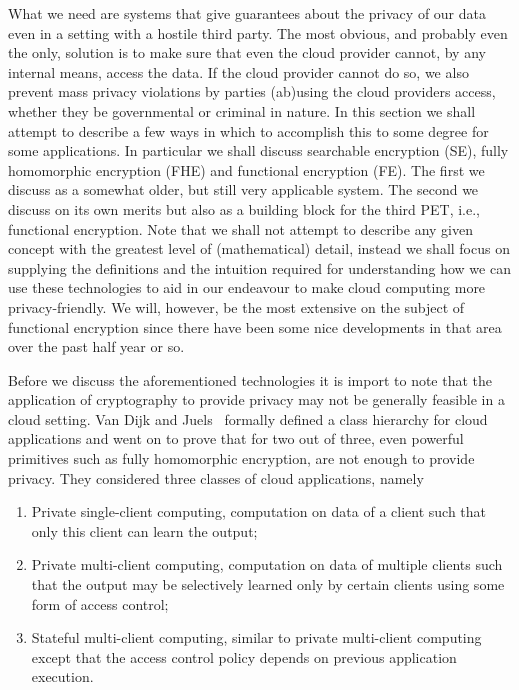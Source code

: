 \documentclass[11pt, a4paper]{article}
\begin{document}
What we need are systems that give guarantees about the privacy of our data even in a setting with a hostile third party.
The most obvious, and probably even the only, solution is to make sure that even the cloud provider cannot, by any internal means, access the data.
If the cloud provider cannot do so, we also prevent mass privacy violations by parties (ab)using the cloud providers access, whether they be governmental or criminal in nature.
In this section we shall attempt to describe a few ways in which to accomplish this to some degree for some applications.
In particular we shall discuss searchable encryption (SE), fully homomorphic encryption (FHE) and functional encryption (FE).
The first we discuss as a somewhat older, but still very applicable system. The second we discuss on its own merits but also as a building block for the third PET, i.e., functional encryption.
Note that we shall not attempt to describe any given concept with the greatest level of (mathematical) detail, instead we shall focus on supplying the definitions and the intuition required for understanding how we can use these technologies to aid in our endeavour to make cloud computing more privacy-friendly. We will, however, be the most extensive on the subject of functional encryption since there have been some nice developments in that area over the past half year or so.

Before we discuss the aforementioned technologies it is import to note that the application of cryptography to provide privacy may not be generally feasible in a cloud setting.
Van Dijk and Juels~\cite{van2010impossibility} formally defined a class hierarchy for cloud applications and went on to prove that for two out of three, even powerful primitives such as fully homomorphic encryption, are not enough to provide privacy.
They considered three classes of cloud applications, namely

\begin{enumerate}
    \item Private single-client computing, computation on data of a client such that only this client can learn the output;
    \item Private multi-client computing, computation on data of multiple clients such that the output may be selectively learned only by certain clients using some form of access control;
    \item Stateful multi-client computing, similar to private multi-client computing except that the access control policy depends on previous application execution.
\end{enumerate}
\end{document}

